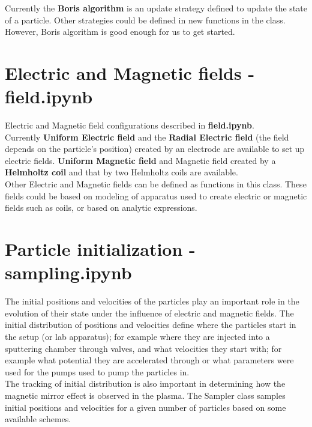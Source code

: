 \documentclass[12pt]{article}
\begin{document}
{		\noindent Currently the \textbf{Boris algorithm} is an update strategy defined to update the state of a particle. Other strategies could be defined in new functions in the class. However, Boris algorithm is good enough for us to get started.
		
		
		
		\section{Electric and Magnetic fields - field.ipynb}
		Electric and Magnetic field configurations described in \textbf{field.ipynb}. \\
		
		\noindent Currently \textbf{Uniform Electric field} and the \textbf{Radial Electric field} (the field depends on the particle's position) created by an electrode are available to set up electric fields. \textbf{Uniform Magnetic field} and Magnetic field created by a \textbf{Helmholtz coil} and that by two Helmholtz coils are available. \\
		
		\noindent Other Electric and Magnetic fields can be defined as functions in this class. These fields could be based on modeling of apparatus used to create electric or magnetic fields such as coils, or based on analytic expressions.
		
		
		
		
		
		\section{Particle initialization - sampling.ipynb}
		The initial positions and velocities of the particles play an important role in the evolution of their state under the influence of electric and magnetic fields. The initial distribution of positions and velocities define where the particles start in the setup (or lab apparatus); for example where they are injected into a sputtering chamber through valves, and what velocities they start with; for example what potential they are accelerated through or what parameters were used for the pumps used to pump the particles in.\\
		
		\noindent The tracking of initial distribution is also important in determining how the magnetic mirror effect is observed in the plasma. The Sampler class samples initial positions and velocities for a given number of particles based on some available schemes. \\
		
}
\end{document}
